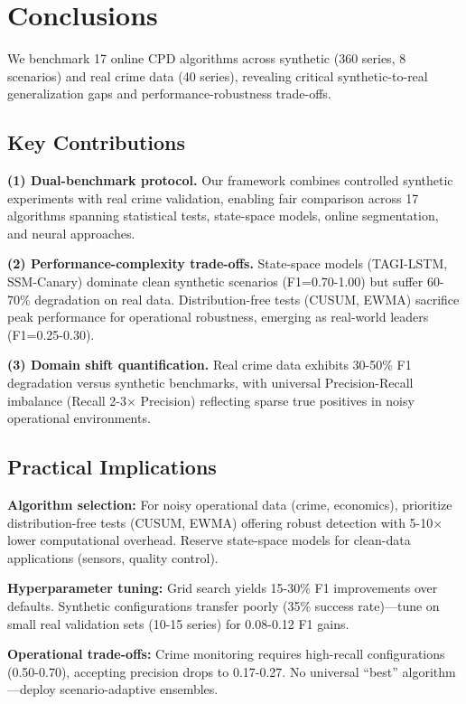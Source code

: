 \documentclass[journal,article,submit,pdftex,moreauthors]{Definitions/mdpi}
\begin{document}
\section{Conclusions}
\label{sec:conclusions}

We benchmark 17 online CPD algorithms across synthetic (360 series, 8 scenarios) and real crime data (40 series), revealing critical synthetic-to-real generalization gaps and performance-robustness trade-offs.

\subsection{Key Contributions}

\textbf{(1) Dual-benchmark protocol.} Our framework combines controlled synthetic experiments with real crime validation, enabling fair comparison across 17 algorithms spanning statistical tests, state-space models, online segmentation, and neural approaches.

\textbf{(2) Performance-complexity trade-offs.} State-space models (TAGI-LSTM, SSM-Canary) dominate clean synthetic scenarios (F1=0.70-1.00) but suffer 60-70\% degradation on real data. Distribution-free tests (CUSUM, EWMA) sacrifice peak performance for operational robustness, emerging as real-world leaders (F1=0.25-0.30).

\textbf{(3) Domain shift quantification.} Real crime data exhibits 30-50\% F1 degradation versus synthetic benchmarks, with universal Precision-Recall imbalance (Recall 2-3× Precision) reflecting sparse true positives in noisy operational environments.


\subsection{Practical Implications}

\textbf{Algorithm selection:} For noisy operational data (crime, economics), prioritize distribution-free tests (CUSUM, EWMA) offering robust detection with 5-10× lower computational overhead. Reserve state-space models for clean-data applications (sensors, quality control).

\textbf{Hyperparameter tuning:} Grid search yields 15-30\% F1 improvements over defaults. Synthetic configurations transfer poorly (35\% success rate)—tune on small real validation sets (10-15 series) for 0.08-0.12 F1 gains.

\textbf{Operational trade-offs:} Crime monitoring requires high-recall configurations (0.50-0.70), accepting precision drops to 0.17-0.27. No universal ``best'' algorithm—deploy scenario-adaptive ensembles.
\end{document}
